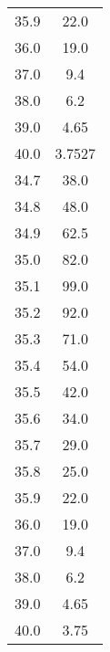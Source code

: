 \begin{table}
\begin{tabular}{S[]S[]}
35.9 & 22.0\\
36.0 & 19.0\\
37.0 & 9.4\\
38.0 & 6.2\\
39.0 & 4.65\\
40.0 & 3.7527\\
34.7 & 38.0\\
34.8 & 48.0\\
34.9 & 62.5\\
35.0 & 82.0\\
35.1 & 99.0\\
35.2 & 92.0\\
35.3 & 71.0\\
35.4 & 54.0\\
35.5 & 42.0\\
35.6 & 34.0\\
35.7 & 29.0\\
35.8 & 25.0\\
35.9 & 22.0\\
36.0 & 19.0\\
37.0 & 9.4\\
38.0 & 6.2\\
39.0 & 4.65\\
40.0 & 3.75\\
\bottomrule
\end{tabular}\end{table}